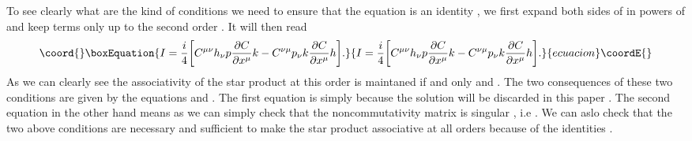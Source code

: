 \documentclass[a4paper,12pt]{article}
\begin{document}
To see clearly what are the kind of conditions we need to ensure
that the equation \coordHE{} is an identity , we first expand both
sides of \coordHE{} in powers of \coordHE{} and keep terms only up to the second
order . It will then read
\begin{equation}\coord{}\boxEquation{
I=\frac{i}{4}\bigg[C^{{\mu}{\nu}}h_{\nu}p{\frac{{\partial}C}{{\partial}x^{\mu}}}k
-C^{{\nu}{\mu}}p_{\nu}k{\frac{{\partial}C}{{\partial}x^{\mu}}}h\bigg].
}{
I=\frac{i}{4}\bigg[C^{{\mu}{\nu}}h_{\nu}p{\frac{{\partial}C}{{\partial}x^{\mu}}}k
-C^{{\nu}{\mu}}p_{\nu}k{\frac{{\partial}C}{{\partial}x^{\mu}}}h\bigg].
}{ecuacion}\coordE{}\end{equation}
As we can clearly see the associativity of the star product at
this order is maintaned if and only
\coordHE{} and \coordHE{} . The two consequences of
these two conditions are given by the equations \coordHE{} and
\coordHE{} . The first
equation is simply \coordHE{} because the solution \coordHE{}
will be discarded in this paper . The second equation in the
other hand means as we can simply check that the noncommutativity
matrix \myHighlight{$\theta$}\coordHE{} is singular , i.e \coordHE{} . We can aslo
check that the two above conditions are necessary and sufficient
to make the star product \coordHE{} associative at all orders
because of the identities \coordHE{}.
\end{document}
